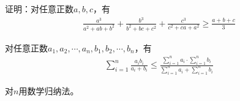 



\begin{question}
  证明：对任意正数$a,b,c$，有
  \begin{align*}
    \frac{a^3}{a^2+ab+b^2}+\frac{b^3}{b^2+bc+c^2}+\frac{c^3}{c^2+ca+a^2}
    \ge
    \frac{a+b+c}{3}
  \end{align*}
\end{question}

\begin{question}
  对任意正数$a_1,a_2,\cdots,a_n,b_1,b_2,\cdots,b_n$，有
  \begin{align*}
    \sum_{i=1}^n\frac{a_ib_i}{a_i+b_i}\le
    \frac{\sum\limits_{i=1}^n a_i \cdot \sum\limits_{i=1}^n b_i}
         {\sum\limits_{i=1}^n a_i + \sum\limits_{i=1}^n b_i}
  \end{align*}
\end{question}
对$n$用数学归纳法。

